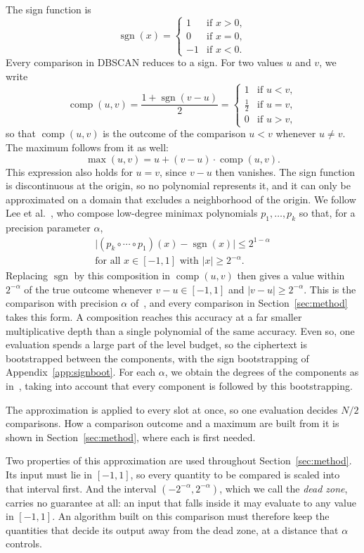 The sign function is
\[
  \operatorname{sgn}(x) =
  \begin{cases}
    1 & \text{if } x > 0, \\
    0 & \text{if } x = 0, \\
    -1 & \text{if } x < 0.
  \end{cases}
\]
Every comparison in DBSCAN reduces to a sign. For two values $u$ and $v$,
we write
\[
  \operatorname{comp}(u,v) = \frac{1 + \operatorname{sgn}(v-u)}{2}
  = \begin{cases}
      1 & \text{if } u < v, \\
      \tfrac{1}{2} & \text{if } u = v, \\
      0 & \text{if } u > v,
    \end{cases}
\]
so that $\operatorname{comp}(u,v)$ is the outcome of the comparison
$u < v$ whenever $u \ne v$. The maximum follows from it as well:
\[
  \max(u,v) = u + (v-u) \cdot \operatorname{comp}(u,v).
\]
This expression also holds for $u = v$, since $v - u$ then vanishes.
The sign function is discontinuous at the origin, so no polynomial
represents it, and it can only be approximated on a domain that excludes
a neighborhood of the origin. We follow Lee et
al.~\cite{lee2021minimax}, who compose low-degree minimax polynomials
$p_1, \dots, p_k$ so that, for a precision parameter $\alpha$,
\begin{gather*}
  \bigl| (p_k \circ \cdots \circ p_1)(x) - \operatorname{sgn}(x) \bigr|
  \le 2^{1-\alpha} \\
  \text{for all } x \in [-1,1] \text{ with } |x| \ge 2^{-\alpha}.
\end{gather*}
Replacing $\operatorname{sgn}$ by this composition in
$\operatorname{comp}(u,v)$ then gives a value within $2^{-\alpha}$ of the
true outcome whenever $v - u \in [-1,1]$ and $|v - u| \ge 2^{-\alpha}$.
This is the comparison with precision $\alpha$
of~\cite{lee2021minimax}, and every comparison in
Section~\ref{sec:method} takes this form. A composition reaches this
accuracy at a far smaller multiplicative depth than a single polynomial of
the same accuracy. Even so, one evaluation spends a large part of the
level budget, so the ciphertext is bootstrapped between the components,
with the sign bootstrapping of Appendix~\ref{app:signboot}. For each
$\alpha$, we obtain the degrees of the components as
in~\cite{lee2021minimax}, taking into account that every component is
followed by this bootstrapping.

The approximation is applied to every slot at once, so one evaluation
decides $N/2$ comparisons. How a comparison outcome and a maximum are
built from it is shown in Section~\ref{sec:method}, where each is first
needed.

Two properties of this approximation are used throughout
Section~\ref{sec:method}. Its input must lie in $[-1,1]$, so every
quantity to be compared is scaled into that interval first. And the
interval $(-2^{-\alpha}, 2^{-\alpha})$, which we call the \emph{dead
zone}, carries no guarantee at all: an input that falls inside it may
evaluate to any value in $[-1,1]$. An algorithm built on this comparison
must therefore keep the quantities that decide its output away from the
dead zone, at a distance that $\alpha$ controls.
